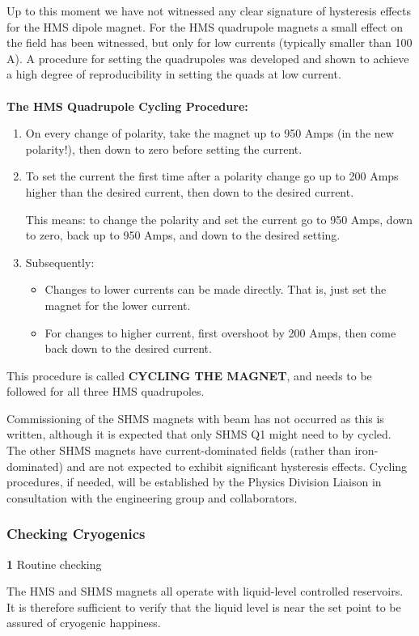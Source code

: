 Up to this moment we have not witnessed any clear signature of hysteresis
effects for the HMS dipole magnet. For the HMS quadrupole magnets a small effect
on the field has been witnessed, but only for low currents (typically smaller
than 100 A). A procedure for setting the quadrupoles was developed
and shown to achieve a high
degree of reproducibility in setting the quads at low current.
\\
\\
\textbf{The HMS Quadrupole Cycling Procedure:}
\begin{enumerate}
\item{On every change of polarity, take the magnet up to 950 Amps
  (in the new polarity!), then down to zero before setting the
  current.}
\item{To set the current the first time after a polarity change
  go up to 200 Amps higher than the desired current,
  then down to the desired current.

  This means: to change the polarity and set the current go to 950 Amps,
  down to zero, back up to 950 Amps, and down to the desired setting.}
\item{Subsequently:
  \begin{itemize}
  \item{Changes to lower currents can be made directly.
    That is, just set the magnet for the lower current.}
  \item{For changes to higher current, first overshoot
    by 200 Amps, then come back down to the desired current.}
\end{itemize}}
\end{enumerate}
This procedure is called \textbf{CYCLING THE MAGNET}, and needs to be  followed for all three HMS quadrupoles.

Commissioning of the SHMS magnets with beam has not occurred as this is written, although it
is expected that only SHMS Q1 might need to by cycled. The other SHMS magnets have
current-dominated fields (rather than iron-dominated) and are not expected to
exhibit significant hysteresis effects. Cycling procedures, if needed, will be established by
the Physics Division Liaison in consultation with the engineering group and collaborators.

\subsubsection{Checking Cryogenics}

\begin{description}
\item{\bf 1}\hskip0.1in Routine checking
\item{}\hskip0.3in The HMS and SHMS magnets all operate with liquid-level controlled
  reservoirs. It is therefore sufficient to verify that the liquid level
  is near the set point to be assured of cryogenic happiness.
\end{description}

